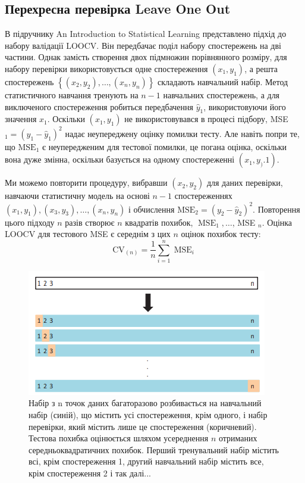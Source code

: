\documentclass[14pt,a4paper]{extarticle}
\newcounter{e}
\numberwithin{equation}{section}
\numberwithin{figure}{section}
\begin{document}
	\subsection{Перехресна перевірка Leave One Out}
    В підручнику An Introduction to Statistical Learning \cite{statistical2013} представлено підхід до набору валідації LOOCV. Він передбачає поділ набору спостережень на дві частини. Однак замість створення двох підмножин порівнянного розміру, для набору перевірки використовується одне спостереження $\left(x_{1}, y_{1}\right)$, а решта спостережень $\left\{\left( x_{2}, y_{2}\right), \ldots,\left(x_{n}, y_{n}\right)\right\}$ складають навчальний набір. Метод статистичного навчання тренують на $n-1$ навчальних спостережень, а для виключеного спостереження робиться передбачення $\hat{y}_{1}$, використовуючи його значення $x_{1}$. Оскільки $\left(x_{1}, y_{1}\right)$ не використовувався в процесі підбору, MSE $_{1}=\left(y_{1}-\hat{y}_{1}\right)^{2}$ надає неупереджену оцінку помилки тесту. Але навіть попри те, що $\mathrm{MSE}_{1}$ є неупередженим для тестової помилки, це погана оцінка, оскільки вона дуже змінна, оскільки базується на одному спостереженні $\left(x_{1}, y_). {1}\right)$.
    
    Ми можемо повторити процедуру, вибравши $(x_{2}, y_{2})$ для даних перевірки, навчаючи статистичну модель на основі $n-1$ спостереженнях ${(x_{1}, y_{1}),(x_{3}, y_{3}), \ldots,(x_{n}, y_{n}) }$ і обчислення $\mathrm{MSE}_{2}=\left(y_{2}-\hat{y}_{2}\right)^{2}$. Повторення цього підходу $n$ разів створює $n$ квадратів похибок, $\operatorname{MSE}_{1}, \ldots$, MSE $_{n}$. Оцінка LOOCV для тестового MSE є середнім з цих $n$ оцінок похибок тесту:
    $$
    \mathrm{CV}_{(n)}=\frac{1}{n} \sum_{i=1}^{n} \operatorname{MSE}_{i}
    $$
        
    \begin{figure}[h!]
        \centering
        \includegraphics[width=0.6 \textwidth]{images/8.png}
        \caption{Набір з n точок даних багаторазово розбивається на навчальний набір (синій), що містить усі спостереження, крім одного, і набір перевірки, який містить лише це спостереження (коричневий). Тестова похибка оцінюється шляхом усереднення $n$ отриманих середньоквадратичних похибок. Перший тренувальний набір містить всі, крім спостереження 1, другий навчальний набір містить все, крім спостереження 2 і так далі...}
        \label{fig:8}
    \end{figure}
\end{document}
